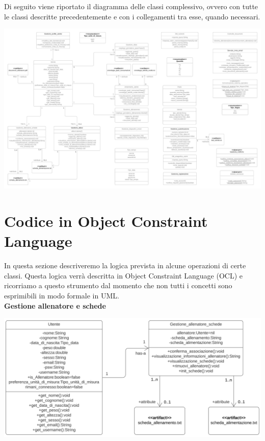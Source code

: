 \documentclass{article}
\begin{document}
    Di seguito viene riportato il diagramma delle classi complessivo, ovvero con tutte le classi descritte precedentemente e con i collegamenti tra esse, quando necessari.

    
    \begin{center}
        \includegraphics[width=\textheight, height=\textwidth,keepaspectratio, angle=90]{class diagram/Class diagram.png}
    \end{center}
    
    \section{Codice in Object Constraint Language} 
    
    In questa sezione descriveremo la logica prevista in alcune operazioni di certe classi. Questa logica verrà descritta in Object Constraint Language (OCL) e ricorriamo a questo strumento dal momento che non tutti i concetti sono esprimibili in modo formale in UML.\\


    
{\large\textbf{Gestione allenatore e schede}}\\


     \begin{center}
            \includegraphics[scale=0.5]{classi/Gestione_allenatore_schede.png}
    \end{center}
    
\end{document}
